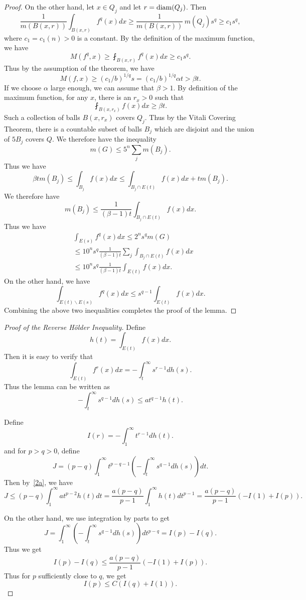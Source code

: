 \begin{proof}
 On the other hand, let $x\in Q_j$ and let $r={\rm diam}(Q_j)$. Then
 \[
 \frac{1}{m(B(x,r))}\int_{B(x,r)} f^q(x) dx\geq \frac{1}{m(B(x,r))}\, m(Q_j) s^q\geq c_1 s^q,
 \]
 where $c_1=c_1(n)>0$ is a constant. By the definition of the maximum function, we have
 \[
 M(f^q,x)\geq\fint_{B(x,r)} f^q(x) dx\geq c_1 s^q. 
 \]
 Thus by the assumption of the theorem, we have
 \[
 M(f,x)\geq (c_1/b)^{1/q} s=(c_1/b)^{1/q} \alpha t>\beta t.
 \]
 If we choose $\alpha$ large enough, we can assume that $\beta>1$. By definition of the maximum function, for any $x$, there is an $r_x>0$ such that
 \[
 \fint_{B(x,r_x)} f(x)dx\geq \beta t.
 \]
 Such a collection of balls $B(x,r_x)$ covers $Q_j$. Thus by the Vitali Covering Theorem, there is a countable subset of balls $B_j$ which are disjoint and the union of $5B_j$ covers $Q$. We therefore have the inequality
 \[
 m(G)\leq 5^n\sum_j m(B_j).
 \]
 Thus we have
 \[
 \beta tm(B_j)\leq\int_{B_j} f(x) dx\leq\int_{B_j\cap E(t)} f(x) dx+tm(B_j).
 \]
 We therefore have
 \[
 m(B_j)\leq\frac{1}{(\beta-1) t}\int_{B_j\cap E(t)} f(x) dx. 
 \]
Thus we have
\[
\begin{split}
&\int_{E(s)} f^q(x)dx\leq 2^n s^qm(G)\\
&\leq 10^n s^q\frac{1}{(\beta-1) t}\sum_j\int_{B_j\cap E(t)} f(x) dx\\&
\leq 10^n s^q\frac{1}{(\beta-1) t}\int_{ E(t)} f(x) dx.
\end{split}
\]
 On the other hand, we have
 \[
 \int_{E(t)\backslash E(s)} f^q(x) dx\leq s^{q-1}\int_{E(t)} f(x) dx.
 \]
Combining the above two inequalities completes the proof of the lemma. 

\end{proof}
 
\begin{proof}[Proof of the Reverse H\"older Inequality]
Define
\[
h(t)=\int_{E(t)} f(x) dx.
\]
Then it is easy to verify that 
\[
\int_{E(t)} f^r(x) dx=-\int_t^\infty s^{r-1} dh(s).
\]
Thus the lemma can be written as
\begin{equation}\label{2a}
-\int_t^\infty s^{q-1} dh(s)\leq at^{q-1} h(t).
\end{equation}

Define
\[
I(r)=-\int_1^\infty t^{r-1}dh(t).
\]
and for $p>q>0$, define
\[
J=(p-q)\int_1^\infty t^{p-q-1}\left(-\int_t^\infty s^{q-1}dh(s)\right) dt.
\]
Then by~\eqref{2a}, we have
\[
J\leq (p-q)\int_1^\infty at^{p-2} h(t) dt=\frac{a(p-q)}{p-1}\int_1^\infty h(t) dt^{p-1}=
\frac{a(p-q)}{p-1}(-I(1)+I(p)).
\]

On the other hand, we use integration by parts to get
\[
J=\int_1^\infty\left(-\int_t^\infty s^{q-1}dh(s)\right)dt^{p-q}=I(p)-I(q).
\]
Thus we get
\[
I(p)-I(q)\leq \frac{a(p-q)}{p-1}(-I(1)+I(p)).
\]
Thus for $p$ sufficiently close to $q$, we get
\[
I(p)\leq C(I(q)+I(1)).
\]


\end{proof}


